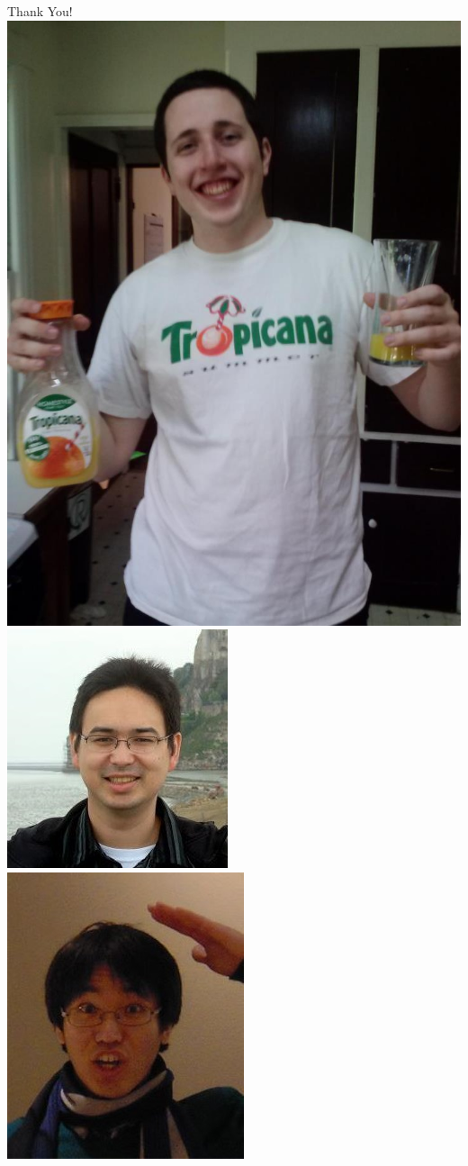 \documentclass[12pt]{beamer}
\begin{document}
\begin{frame}{Thank You!}
\hfill
\includegraphics[height=\picheight]{dave}
\hfill
\includegraphics[height=\picheight]{mow}
\hfill
\includegraphics[height=\picheight]{minseok}


\end{frame}
\end{document}
